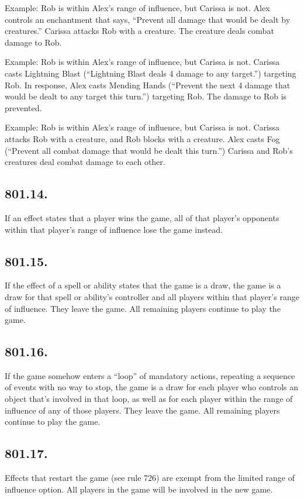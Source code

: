 Example: Rob is within Alex’s range of influence, but Carissa is not. Alex controls an enchantment that says, “Prevent all damage that would be dealt by creatures.” Carissa attacks Rob with a creature. The creature deals combat damage to Rob.

Example: Rob is within Alex’s range of influence, but Carissa is not. Carissa casts Lightning Blast (“Lightning Blast deals 4 damage to any target.”) targeting Rob. In response, Alex casts Mending Hands (“Prevent the next 4 damage that would be dealt to any target this turn.”) targeting Rob. The damage to Rob is prevented.

Example: Rob is within Alex’s range of influence, but Carissa is not. Carissa attacks Rob with a creature, and Rob blocks with a creature. Alex casts Fog (“Prevent all combat damage that would be dealt this turn.”) Carissa and Rob’s creatures deal combat damage to each other.

\subsection*{801.14.}
If an effect states that a player wins the game, all of that player’s opponents within that player’s range of influence lose the game instead.

\subsection*{801.15.}
If the effect of a spell or ability states that the game is a draw, the game is a draw for that spell or ability’s controller and all players within that player’s range of influence. They leave the game. All remaining players continue to play the game.

\subsection*{801.16.}
If the game somehow enters a “loop” of mandatory actions, repeating a sequence of events with no way to stop, the game is a draw for each player who controls an object that’s involved in that loop, as well as for each player within the range of influence of any of those players. They leave the game. All remaining players continue to play the game.

\subsection*{801.17.}
Effects that restart the game (see rule 726) are exempt from the limited range of influence option. All players in the game will be involved in the new game.

